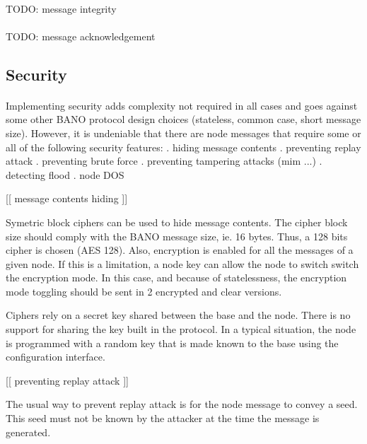 \documentclass[a4paper, 11pt]{article}
\begin{document}

\paragraph{}
TODO: message integrity

\paragraph{}
TODO: message acknowledgement


\subsection{Security}
\paragraph{}
Implementing security adds complexity not required in all cases and goes against
some other BANO protocol design choices (stateless, common case, short message
size). However, it is undeniable that there are node messages that require some
or all of the following security features:
. hiding message contents
. preventing replay attack
. preventing brute force
. preventing tampering attacks (mim ...)
. detecting flood
. node DOS


[[ message contents hiding ]]

Symetric block ciphers can be used to hide message contents. The cipher
block size should comply with the BANO message size, ie. 16 bytes. Thus,
a 128 bits cipher is chosen (AES 128). Also, encryption is enabled for
all the messages of a given node. If this is a limitation, a node key
can allow the node to switch switch the encryption mode. In this case,
and because of statelessness, the encryption mode toggling should be
sent in 2 encrypted and clear versions.

Ciphers rely on a secret key shared between the base and the node. There
is no support for sharing the key built in the protocol. In a typical
situation, the node is programmed with a random key that is made known
to the base using the configuration interface.


[[ preventing replay attack ]]

The usual way to prevent replay attack is for the node message to convey
a seed. This seed must not be known by the attacker at the time the message
is generated.
\end{document}
